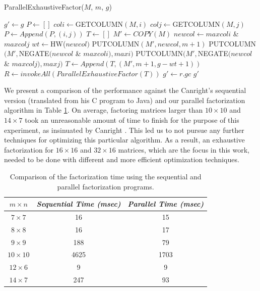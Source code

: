 \begin{algorithm}[ht!] %
\caption{ParallelExhaustiveFactor($M$, $m$, $g$)} \label{alg:parallelOptimize}
\begin{algorithmic}[1]
	\State $g' \gets g$
	\State $P \gets []$
			\State $coli \gets $GETCOLUMN$(M, i)$
			\State $colj \gets $GETCOLUMN$(M, j)$
				\State $P \gets Append(P, (i, j))$
			\EndIf
		\EndFor
	\EndFor
	\State $T \gets []$
		\State $M' \gets COPY(M)$
		\State $newcol \gets maxcoli $ \& $ maxcolj$
		\State $wt \gets $HW($newcol)$
		\State PUTCOLUMN$(M', newcol, m + 1)$
		\State PUTCOLUMN$(M', $NEGATE$(newcol $ \& $ maxcoli), maxi)$
		\State PUTCOLUMN$(M', $NEGATE$(newcol $ \& $ maxcolj), maxj)$
		\State $T \gets Append(T, (M', m + 1, g - wt + 1))$
	\EndFor
	\State $R \gets invokeAll(ParallelExhaustiveFactor(T))$
			\State $g' \gets r.gc$
		\EndIf
	\EndFor
	\State \Return $g'$ 
\end{algorithmic}
\end{algorithm}

We present a comparison of the performance against the Canright's sequential version (translated from his C program to Java) and our parallel factorization algorithm in Table \ref{tab:factorTimes}. On average, factoring matrices larger than $10 \times 10$ and $14 \times 7$ took an unreasonable amount of time to finish for the purpose of this experiment, as insinuated by Canright \cite{Canright05-1}. This led us to not pursue any further techniques for optimizing this particular algorithm. As a result, an exhaustive factorization for $16 \times 16$ and $32 \times 16$ matrices, which are the focus in this work, needed to be done with different and more efficient optimization techniques.

\begin{table}
\label{tab:factorTimes}
\caption{Comparison of the factorization time using the sequential and parallel factorization programs. }
\begin{center}
	\begin{tabular}{| c | c | c |} \hline
	$m \times n$ & \emph{Sequential Time (msec)} & \emph{Parallel Time (msec)} \\ \hline
	$7 \times 7$ & 16 & 15 \\ 
	$8 \times 8$ & 16 & 17 \\ 
	$9 \times 9$ & 188 & 79 \\ 
	$10 \times 10$ & 4625 & 1703 \\ 
	$12 \times 6$ & 9 & 9 \\
	$14 \times 7$ & 247 & 93 \\ \hline
	\end{tabular}
\end{center}
\end{table}

